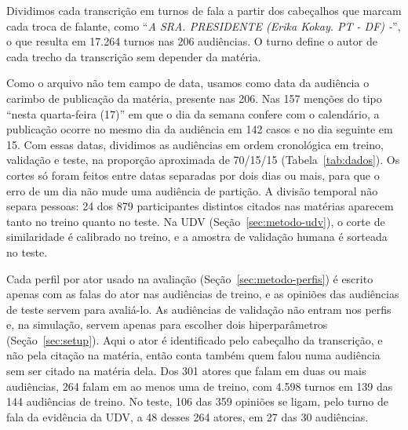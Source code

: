 Dividimos cada transcrição em turnos de fala a partir dos cabeçalhos que marcam cada troca de
falante, como ``\textit{A SRA. PRESIDENTE (Erika Kokay. PT - DF) -}'', o que resulta em 17.264 turnos
nas 206 audiências. O turno define o autor de
cada trecho da transcrição sem depender da matéria.

Como o arquivo não tem campo de data, usamos como data da audiência o carimbo de publicação da
matéria, presente nas 206. Nas 157
menções do tipo ``nesta quarta-feira (17)'' em que o dia da semana confere com o calendário, a
publicação ocorre no mesmo dia da audiência em 142 casos e no dia seguinte em 15. Com essas datas,
dividimos as audiências em ordem cronológica em treino, validação e teste, na proporção aproximada de
70/15/15 (Tabela~\ref{tab:dados}). Os cortes só foram feitos entre datas separadas por dois dias ou
mais, para que o erro de um dia não mude uma audiência de partição. A divisão temporal não separa
pessoas: 24 dos 879 participantes distintos citados nas matérias aparecem tanto no treino quanto no
teste. Na UDV (Seção~\ref{sec:metodo-udv}), o corte de similaridade é calibrado no treino, e a amostra de
validação humana é sorteada no teste.

Cada perfil por ator usado na avaliação (Seção~\ref{sec:metodo-perfis}) é escrito apenas com as
falas do ator nas audiências de treino, e as opiniões das audiências de teste servem para avaliá-lo.
As audiências de validação não entram nos perfis e, na simulação, servem apenas para escolher dois hiperparâmetros
(Seção~\ref{sec:setup}). Aqui o ator é identificado pelo cabeçalho da
transcrição, e não pela citação na matéria, então conta também quem falou numa audiência sem ser
citado na matéria dela. Dos 301 atores que falam em duas ou mais audiências, 264 falam em ao menos uma
de treino, com 4.598 turnos em 139 das 144 audiências de treino. No teste, 106 das 359 opiniões se
ligam, pelo turno de fala da evidência da UDV, a 48 desses 264 atores, em 27 das 30 audiências.



